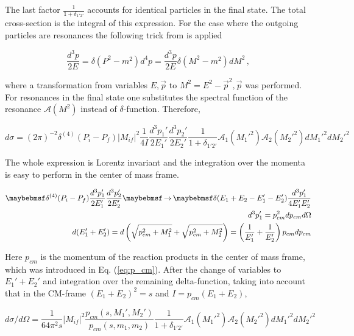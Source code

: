 The last factor $\frac{1}{1+\delta_{1'2'}}$ accounts for identical particles in
the final state. The total cross-section is the integral of this expression. For the
case where the outgoing particles are resonances the following trick from
\cite{Wolf:1992qja} is applied

\begin{equation}
  \frac{d^3p}{2E} = \delta(P^2 - m^2) d^4p = \frac{d^3p}{2E} \delta(M^2 - m^2) dM^2 \,,
\end{equation}

where a transformation from variables $E,\vec{p}$ to $M^2 = E^2 - \vec{p}^2,
\vec{p}$ was performed. For resonances in the final state one substitutes
the spectral function of the resonance $\mathcal{A}(M^2)$ instead of $\delta$-function.
Therefore,

\begin{equation} \label{eq:sigma22}
  d\sigma = (2\pi)^{-2} \delta^{(4)}(P_i-P_f) |M_{if}|^2 \frac{1}{4 I}
            \frac{d^3p_1'}{2E_1'} \frac{d^3p_2'}{2E_2'} \frac{1}{1+\delta_{1'2'}}
            \mathcal{A}_1(M_1'^2) \mathcal{A}_2(M_2'^2) dM_1'^2 dM_2'^2
\end{equation}

The whole expression is Lorentz invariant and the integration over
the momenta is easy to perform in the center of mass frame.

\begin{eqnarray}
  \delta^{(4)}(P_i-P_f) \frac{d^3p_1'}{2E_1'} \frac{d^3p_2'}{2E_2'} \to
  \delta(E_1+E_2 - E_1'- E_2') \frac{d^3p_1'}{4E_1'E_2'} \\
  d^3p_1' = p_{cm}^2 dp_{cm} d\Omega \\
  d(E_1'+ E_2') = d \parenths{\sqrt{p_{cm}^2 +M_1^2} +\sqrt{p_{cm}^2 +M_2^2}} =
  \parenths{\frac{1}{E_1'} + \frac{1}{E_2'}} p_{cm} dp_{cm}
\end{eqnarray}

Here $p_{cm}$ is the momentum of the reaction products in the center of mass frame,
which was introduced in Eq. (\ref{eq:p_cm}). After the change of variables to
$E_1'+ E_2'$ and integration over the remaining delta-function, taking into
account that in the CM-frame $(E_1+E_2)^2 = s$ and $I = p_{cm} (E_1+E_2)$,

\begin{equation}
  d\sigma/d\Omega = \frac{1}{64\pi^2 s} |M_{if}|^2 \frac{p_{cm}(s, M_1',M_2')}{p_{cm}(s, m_1,m_2)}
  \frac{1}{1+\delta_{1'2'}} \mathcal{A}_1(M_1'^2) \mathcal{A}_2(M_2'^2) dM_1'^2 dM_2'^2
\end{equation}

